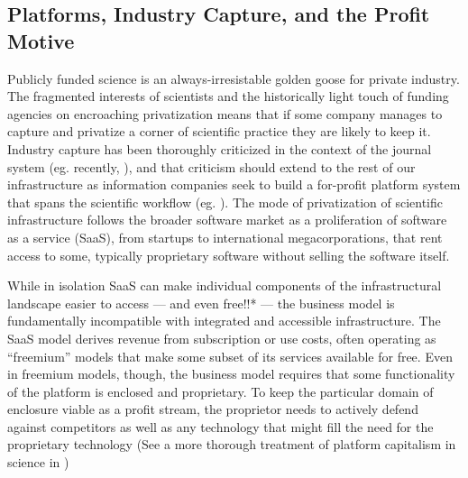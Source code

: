 \hypertarget{platforms-industry-capture-and-the-profit-motive}{%
\subsection{Platforms, Industry Capture, and the Profit
Motive}\label{platforms-industry-capture-and-the-profit-motive}}

Publicly funded science is an always-irresistable golden goose for
private industry. The fragmented interests of scientists and the
historically light touch of funding agencies on encroaching
privatization means that if some company manages to capture and
privatize a corner of scientific practice they are likely to keep it.
Industry capture has been thoroughly criticized in the context of the
journal system (eg. recently, \citep{brembsReplacingAcademicJournals2021} ), and that criticism should
extend to the rest of our infrastructure as information companies seek
to build a for-profit platform system that spans the scientific workflow
(eg. \citep{ElsevierSevenBridges2017} ). The mode of privatization
of scientific infrastructure follows the broader software market as a
proliferation of software as a service (SaaS), from startups to
international megacorporations, that rent access to some, typically
proprietary software without selling the software itself.

While in isolation SaaS can make individual components of the
infrastructural landscape easier to access --- and even free!!* --- the
business model is fundamentally incompatible with integrated and
accessible infrastructure. The SaaS model derives revenue from
subscription or use costs, often operating as ``freemium'' models that
make some subset of its services available for free. Even in freemium
models, though, the business model requires that some functionality of
the platform is enclosed and proprietary. To keep the particular domain
of enclosure viable as a profit stream, the proprietor needs to actively
defend against competitors as well as any technology that might fill the
need for the proprietary technology (See a more thorough
treatment of platform capitalism in science in \citep{mirowskiFutureOpenScience2018} )

